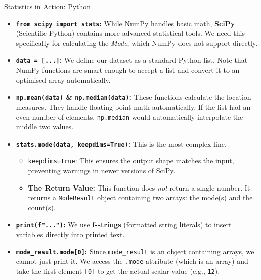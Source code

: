 \begin{frame}{Statistics in Action: Python}
{\begin{itemize}
            \item \textbf{\texttt{from scipy import stats}:} While NumPy handles basic math, \textbf{SciPy} (Scientific Python) contains more advanced statistical tools. We need this specifically for calculating the \textit{Mode}, which NumPy does not support directly.
            
            \item \textbf{\texttt{data = [...]}:} We define our dataset as a standard Python list. Note that NumPy functions are smart enough to accept a list and convert it to an optimised array automatically.
            
            \item \textbf{\texttt{np.mean(data)} \& \texttt{np.median(data)}:} These functions calculate the location measures. They handle floating-point math automatically. If the list had an even number of elements, \texttt{np.median} would automatically interpolate the middle two values.
            
            \item \textbf{\texttt{stats.mode(data, keepdims=True)}:} This is the most complex line. 
            \begin{itemize}
                \item \texttt{keepdims=True}: This ensures the output shape matches the input, preventing warnings in newer versions of SciPy.
                \item \textbf{The Return Value:} This function does \textit{not} return a single number. It returns a \texttt{ModeResult} object containing two arrays: the mode(s) and the count(s).
            \end{itemize}

            \item \textbf{\texttt{print(f"...")}:} We use \textbf{f-strings} (formatted string literals) to insert variables directly into printed text.
            
            \item \textbf{\texttt{mode\_result.mode[0]}:} Since \texttt{mode\_result} is an object containing arrays, we cannot just print it. We access the \texttt{.mode} attribute (which is an array) and take the first element \texttt{[0]} to get the actual scalar value (e.g., \texttt{12}).
        \end{itemize}
    }
\end{frame}

